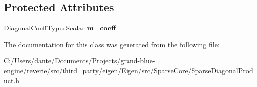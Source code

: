 \subsection*{Protected Attributes}
\begin{DoxyCompactItemize}
\item 
\mbox{\label{class_eigen_1_1internal_1_1sparse__diagonal__product__evaluator_3_01_sparse_xpr_type_00_01_diagocbb91bd40f7346bf4110a7aa087884f6_af65efa4ced355177b7f8d9f5c3ae75ae}} 
Diagonal\+Coeff\+Type\+::\+Scalar {\bfseries m\+\_\+coeff}
\end{DoxyCompactItemize}


The documentation for this class was generated from the following file\+:\begin{DoxyCompactItemize}
\item 
C\+:/\+Users/dante/\+Documents/\+Projects/grand-\/blue-\/engine/reverie/src/third\+\_\+party/eigen/\+Eigen/src/\+Sparse\+Core/Sparse\+Diagonal\+Product.\+h\end{DoxyCompactItemize}

